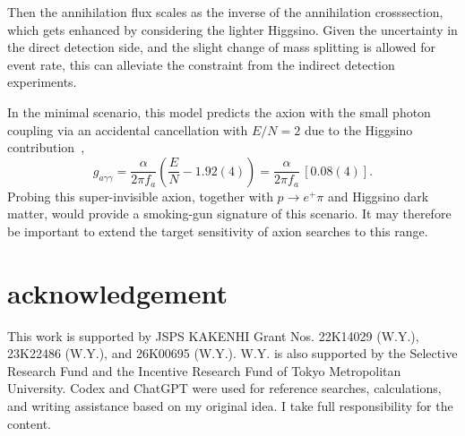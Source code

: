 \documentclass[superscriptaddress,aps,preprintnumbers,amsmath,amssymb,prd,nofootinbib,reprint]{revtex4-1}
\newcommand{\beq}{\begin{equation}}  \newcommand{\eeq}{\end{equation}}
\def\WY#1{#1}
\begin{document}
\WY{Then the
annihilation flux scales as the inverse of the annihilation crosssection, which gets enhanced by considering the lighter Higgsino.  Given the uncertainty in the direct detection side, and the slight change of mass splitting is allowed for event rate, this can alleviate the constraint from the indirect detection experiments.}


In the minimal scenario, this model predicts the axion with the small photon coupling via an accidental cancellation with $E/N=2$ due to the Higgsino contribution~\cite{GrillidiCortona:2015jxo}, 
\beq g_{a\gamma\gamma}
=
\frac{\alpha}{2\pi f_a}
\left(\frac EN-1.92(4)\right)
=
\frac{\alpha}{2\pi f_a}\,[0.08(4)].\eeq
Probing this super-invisible axion, together with $p\to e^+\pi$ and Higgsino dark matter, would provide a smoking-gun signature of this scenario. It may therefore be important to extend the target sensitivity of axion searches to this range.

\section*{acknowledgement}
This work is supported by JSPS KAKENHI Grant Nos. 22K14029 (W.Y.),
23K22486 (W.Y.), and 26K00695 (W.Y.).  W.Y. is also supported by the Selective
Research Fund and the Incentive Research Fund of Tokyo Metropolitan University.
 Codex and ChatGPT were used for reference searches, calculations, and writing assistance based on my original idea. I take full responsibility for the content.


\end{document}

